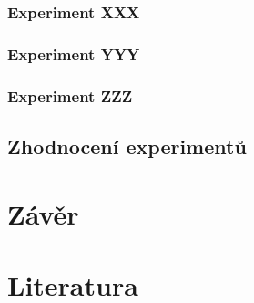 \documentclass[a4paper,11pt]{article}
\begin{document}
\subsubsection{Experiment XXX}
\subsubsection{Experiment YYY}
\subsubsection{Experiment ZZZ}
\subsection{Zhodnocení experimentů}

\section{Závěr}


\section{Literatura}


\newpage

\renewcommand{\refname}{\section{Literatura}}

\end{document}
